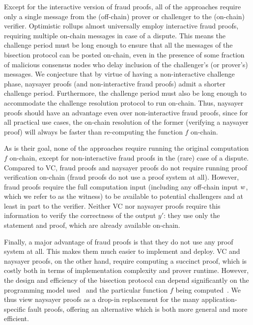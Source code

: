 Except for the interactive version of fraud proofs, all of the approaches require only a single message from the (off-chain) prover or challenger to the (on-chain) verifier. Optimistic rollups almost universally employ interactive fraud proofs, requiring multiple on-chain messages in case of a dispute. This means the challenge period must be long enough to ensure that all the messages of the bisection protocol can be posted on-chain, even in the presence of some fraction of malicious consensus nodes who delay inclusion of the challenger's (or prover's) messages. We conjecture that by virtue of having a non-interactive challenge phase, naysayer proofs (and non-interactive fraud proofs) admit a shorter challenge period. Furthermore, the challenge period must also be long enough to accommodate the challenge resolution protocol to run on-chain. Thus, naysayer proofs should have an advantage even over non-interactive fraud proofs, since for all practical use cases, the on-chain resolution of the former (verifying a naysayer proof) will always be faster than re-computing the function $f$ on-chain.

As is their goal, none of the approaches require running the original computation $f$ on-chain, except for non-interactive fraud proofs in the (rare) case of a dispute. 
Compared to VC, fraud proofs and naysayer proofs do not require running proof verification on-chain (fraud proofs do not use a proof system at all).
However, fraud proofs require the full computation input (including any off-chain input $w$, which we refer to as the witness) to be available to potential challengers and at least in part to the verifier.
Neither VC nor naysayer proofs require this information to verify the correctness of the output $y'$: they use only the statement and proof, which are already available on-chain.

Finally, a major advantage of fraud proofs is that they do not use any proof system at all. This makes them much easier to implement and deploy. VC and naysayer proofs, on the other hand, require computing a succinct proof, which is costly both in terms of implementation complexity and prover runtime. %
However, the design and efficiency of the bisection protocol can depend significantly on the programming model used~\cite{USENIX:KGCWF18} and the particular function $f$ being computed~\cite{PooDry16,PooBut17,EPRINT:SNBB19,EPRINT:SJSW19}.
We thus view naysayer proofs as a drop-in replacement for the many application-specific fault proofs, offering an alternative which is both more general and more efficient.